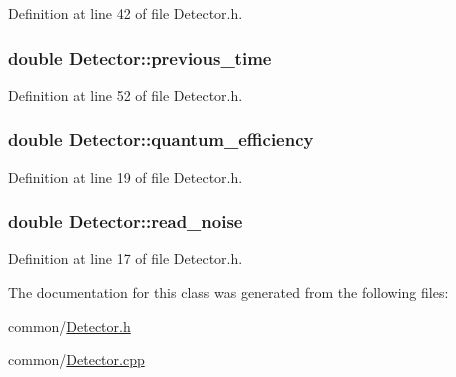 Definition at line 42 of file Detector.h.

\hypertarget{classDetector_a2cb4ca9c009f4465404af3bd4d943788}{
\subsubsection[{previous\_\-time}]{\setlength{\rightskip}{0pt plus 5cm}double {\bf Detector::previous\_\-time}}}
\label{classDetector_a2cb4ca9c009f4465404af3bd4d943788}


Definition at line 52 of file Detector.h.

\hypertarget{classDetector_a4a830152b9beb393e26f8f2e26fda464}{
\subsubsection[{quantum\_\-efficiency}]{\setlength{\rightskip}{0pt plus 5cm}double {\bf Detector::quantum\_\-efficiency}}}
\label{classDetector_a4a830152b9beb393e26f8f2e26fda464}


Definition at line 19 of file Detector.h.

\hypertarget{classDetector_a8eca17062f19ec98b728af67752abf6f}{
\subsubsection[{read\_\-noise}]{\setlength{\rightskip}{0pt plus 5cm}double {\bf Detector::read\_\-noise}}}
\label{classDetector_a8eca17062f19ec98b728af67752abf6f}


Definition at line 17 of file Detector.h.



The documentation for this class was generated from the following files:\begin{DoxyCompactItemize}
\item 
common/\hyperlink{Detector_8h}{Detector.h}\item 
common/\hyperlink{Detector_8cpp}{Detector.cpp}\end{DoxyCompactItemize}
